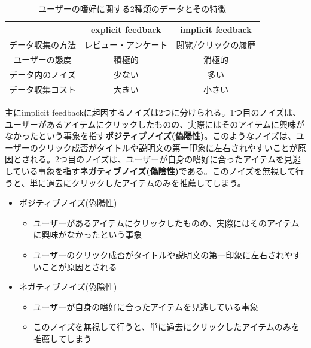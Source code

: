 \documentclass[11pt,a4paper]{article}
\begin{document}
\begin{table}[h]
  \centering
  \begin{tabular}{c||cc}
    & explicit feedback & implicit feedback \\
    \hline
    \hline
    データ収集の方法 & レビュー・アンケート & 閲覧/クリックの履歴 \\ 
    ユーザーの態度 & 積極的 & 消極的 \\
    データ内のノイズ & 少ない & 多い \\
    データ収集コスト & 大きい & 小さい \\    
  \end{tabular}
  \caption{ユーザーの嗜好に関する2種類のデータとその特徴}
\end{table}

主にimplicit feedbackに起因するノイズは2つに分けられる。1つ目のノイズは、ユーザーがあるアイテムにクリックしたものの、実際にはそのアイテムに興味がなかったという事象を指す\textbf{ポジティブノイズ(偽陽性)}。このようなノイズは、ユーザーのクリック成否がタイトルや説明文の第一印象に左右されやすいことが原因とされる。2つ目のノイズは、ユーザーが自身の嗜好に合ったアイテムを見逃している事象を指す\textbf{ネガティブノイズ(偽陰性)}である。このノイズを無視して行うと、単に過去にクリックしたアイテムのみを推薦してしまう。

\begin{itemize}
  \item ポジティブノイズ(偽陽性)
  \begin{itemize}
    \item ユーザーがあるアイテムにクリックしたものの、実際にはそのアイテムに興味がなかったという事象
    \item ユーザーのクリック成否がタイトルや説明文の第一印象に左右されやすいことが原因とされる
  \end{itemize}
  \item ネガティブノイズ(偽陰性)
  \begin{itemize}
    \item ユーザーが自身の嗜好に合ったアイテムを見逃している事象
    \item このノイズを無視して行うと、単に過去にクリックしたアイテムのみを推薦してしまう
  \end{itemize}
\end{itemize}
\end{document}
